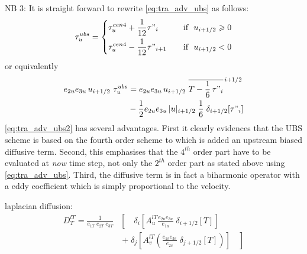 \documentclass[../tex_main/NEMO_manual]{subfiles}
\begin{document}
NB 3: It is straight forward to rewrite \autoref{eq:tra_adv_ubs} as follows:
\begin{equation} \label{eq:tra_adv_ubs2}
\tau _u^{ubs} = \left\{	 \begin{aligned}
	& \tau _u^{cen4} + \frac{1}{12} \tau"_i		& \quad \text{if }\ u_{i+1/2} \geqslant 0 \\
	& \tau _u^{cen4} - \frac{1}{12} \tau"_{i+1}	& \quad \text{if }\ u_{i+1/2}       <       0
  						 \end{aligned}    \right.
\end{equation}
or equivalently 
\begin{equation} \label{eq:tra_adv_ubs2}
\begin{split}
e_{2u} e_{3u}\,u_{i+1/2} \ \tau _u^{ubs} 
&= e_{2u} e_{3u}\,u_{i+1/2} \ \overline{ T - \frac{1}{6}\,\tau"_i }^{\,i+1/2} \\
& - \frac{1}{2} e_{2u} e_{3u}\,|u|_{i+1/2} \;\frac{1}{6} \;\delta_{i+1/2}[\tau"_i]
\end{split}
\end{equation}
\autoref{eq:tra_adv_ubs2} has several advantages.
First it clearly evidences that the UBS scheme is based on the fourth order scheme to which
is added an upstream biased diffusive term.
Second, this emphasises that the $4^{th}$ order part have to be evaluated at \emph{now} time step,
not only the $2^{th}$ order part as stated above using \autoref{eq:tra_adv_ubs}.
Third, the diffusive term is in fact a biharmonic operator with a eddy coefficient which
is simply proportional to the velocity.

laplacian diffusion:
\begin{equation} \label{eq:tra_ldf_lap}
\begin{split}
D_T^{lT} =\frac{1}{e_{1T} \; e_{2T}\;  e_{3T} } &\left[ {\quad \delta _i 
\left[ {A_u^{lT} \frac{e_{2u} e_{3u} }{e_{1u} }\;\delta _{i+1/2} 
\left[ T \right]} \right]} \right.
\\
&\ \left. {+\; \delta _j \left[ 
{A_v^{lT} \left( {\frac{e_{1v} e_{3v} }{e_{2v} }\;\delta _{j+1/2} \left[ T 
\right]} \right)} \right]\quad } \right]
\end{split}
\end{equation}
\end{document}
